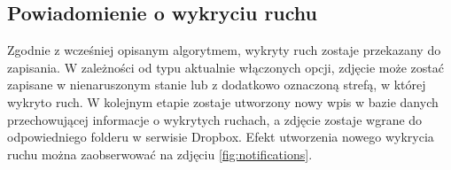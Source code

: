 \subsection{Powiadomienie o wykryciu ruchu}
Zgodnie z wcześniej opisanym algorytmem, wykryty ruch zostaje przekazany do zapisania. W zależności od typu aktualnie włączonych opcji, zdjęcie może zostać zapisane w nienaruszonym stanie lub z dodatkowo oznaczoną strefą, w której wykryto ruch. W kolejnym etapie zostaje utworzony nowy wpis w bazie danych przechowującej informacje o wykrytych ruchach, a zdjęcie zostaje wgrane do odpowiedniego folderu w serwisie Dropbox. Efekt utworzenia nowego wykrycia ruchu można zaobserwować na zdjęciu \ref{fig:notifications}.
